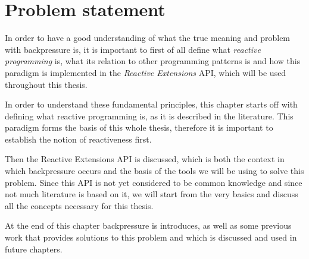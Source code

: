 \chapter{Problem statement}

In order to have a good understanding of what the true meaning and problem with backpressure is, it is important to first of all define what \textit{reactive programming} is, what its relation to other programming patterns is and how this paradigm is implemented in the \textit{Reactive Extensions} API, which will be used throughout this thesis.

In order to understand these fundamental principles, this chapter starts off with defining what reactive programming is, as it is described in the literature. This paradigm forms the basis of this whole thesis, therefore it is important to establish the notion of reactiveness first.

Then the Reactive Extensions API is discussed, which is both the context in which backpressure occurs and the basis of the tools we will be using to solve this problem. Since this API is not yet considered to be common knowledge and since not much literature is based on it, we will start from the very basics and discuss all the concepts necessary for this thesis.

At the end of this chapter backpressure is introduces, as well as some previous work that provides solutions to this problem and which is discussed and used in future chapters.






